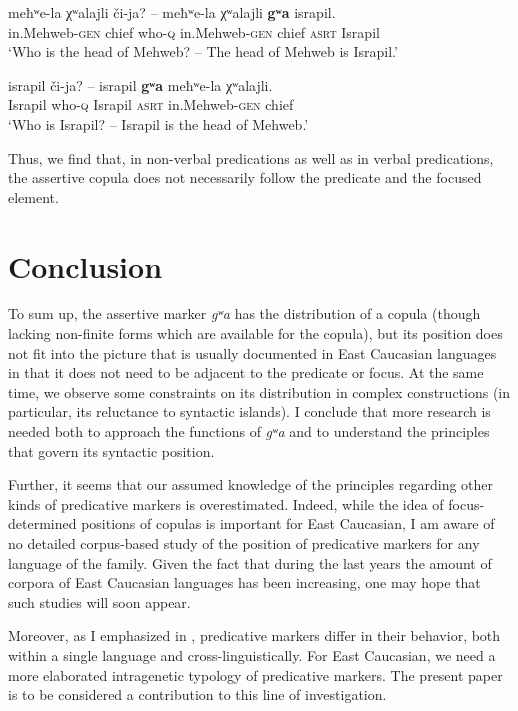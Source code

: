 ﻿\documentclass[output=paper]{langsci/langscibook}
\begin{document}
\ex \label{ex:12:48} %
\gll meħʷe-la χʷalajli či-ja? – meħʷe-la χʷalajli \textbf{gʷa} israpil.\\
in.Mehweb-\textsc{gen} chief who-\textsc{q} {} in.Mehweb-\textsc{gen} chief \textsc{asrt} Israpil\\
\glt `Who is the head of Mehweb? – The head of Mehweb is Israpil.'

\ex \label{ex:12:49} %
\gll israpil či-ja? – israpil \textbf{gʷa} meħʷe-la χʷalajli.\\ 
Israpil who-\textsc{q} {} Israpil \textsc{asrt} in.Mehweb-\textsc{gen} chief\\
\glt `Who is Israpil? – Israpil is the head of Mehweb.'
\z

Thus, we find that, in non-verbal predications as well as in verbal
predications, the assertive copula does not necessarily follow the
predicate and the focused element.

\section{Conclusion}

To sum up, the assertive marker \emph{gʷa} has the distribution of a
copula (though lacking non-finite forms which are available for the
copula), but its position does not fit into the picture that is usually
documented in East Caucasian languages in that it does not need to be
adjacent to the predicate or focus. At the same time, we observe some
constraints on its distribution in complex constructions (in particular,
its reluctance to syntactic islands). I conclude that more research is
needed both to approach the functions of \emph{gʷa} and to understand
the principles that govern its syntactic position.

Further, it seems that our assumed knowledge of the principles regarding
other kinds of predicative markers is overestimated. Indeed, while the
idea of focus-determined positions of copulas is important for East
Caucasian, I am aware of no detailed corpus-based study of the position
of predicative markers for any language of the family. Given the fact
that during the last years the amount of corpora of East Caucasian
languages has been increasing, one may hope that such studies will soon
appear.

Moreover, as I emphasized in , predicative markers differ in
their behavior, both within a single language and cross-linguistically.
For East Caucasian, we need a more elaborated intragenetic typology of
predicative markers. The present paper is to be considered a
contribution to this line of investigation.
\end{document}
